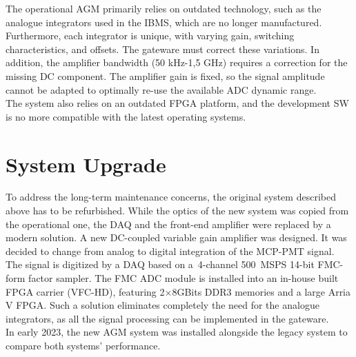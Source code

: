 The operational AGM primarily relies on outdated   technology, such as  the analogue integrators used in the IBMS,  which are no longer manufactured.
%
Furthermore, each integrator is unique, with varying gain, switching characteristics, and offsets. The gateware must correct these variations.
%
%
%
In addition, the amplifier bandwidth (50 kHz-1,5 GHz) %
requires a correction for the missing DC component.
The amplifier gain is fixed,  so the signal amplitude cannot be adapted to optimally re-use the available ADC dynamic range. 
\\
The system also relies on an outdated FPGA platform, and the development SW is no more compatible with the latest operating systems. 

\section{System Upgrade}
To address the long-term maintenance concerns, the original system described above has to be refurbished. 
%
While the optics of the new system was copied from the operational one, the DAQ and the front-end amplifier were replaced by a modern solution.
%
A new DC-coupled variable gain amplifier was designed.
%
It was decided to change from analog to digital integration of the MCP-PMT signal.
%
The signal is digitized by a DAQ based on a~4-channel \SI{500}{MSPS} 14-bit FMC-form factor sampler.
%
The FMC ADC module is installed into an in-house built FPGA carrier (VFC-HD), featuring 2$\times 8$GBits DDR3 memories and a large Arria V FPGA.
%
Such a solution eliminates completely the need for the analogue integrators, as all the signal processing can be implemented in the gateware.
\\
In early 2023, the new AGM system was installed alongside the legacy system to compare both systems' performance.

